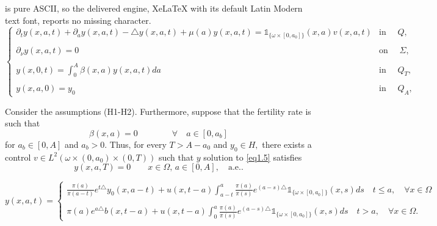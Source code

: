\documentclass[10pt,a4paper]{amsart}
\begin{document}
is pure ASCII, so the delivered engine, XeLaTeX with its default Latin Modern text font, reports no missing character.
\begin{equation}\label{eq1.5}
\left\lbrace 
\begin{array}{ll}
\partial_{t}y(x,a,t)+\partial_{a}y(x,a,t)-\triangle y(x,a,t)+\mu(a) y(x,a,t)=\mathds{1}_{\lbrace\omega\times[0,a_0]\rbrace}(x,a)v(x,a,t) &\text{in }\quad Q,\\
 \\\partial_{\nu}y(x,a,t)=0 &\text{on }\quad \Sigma,\\
 \\y(x,0,t)=\displaystyle\int_{0}^{A}\beta(x,a)y(x,a,t)da &\text{in }\quad Q_{T},\\
 \\y(x,a,0)=y_{0} &\text{in }\quad Q_{A},
\end{array}
\right.
\end{equation} 

\begin{proposition}\label{th1.3}
Consider the assumptions (H1-H2). Furthermore, suppose that the fertility rate is such that
\begin{equation*}
\beta(x,a)=0\qquad\qquad \forall\quad a\in [0, a_b]
\end{equation*}
for $a_b \in [0, A]$ and $a_b>0$. Thus, for every $T>A-a_0$ and  $y_0\in H,$ there exists a control $v\in L^2(\omega\times(0,a_0)\times(0,T) )$ such that $y$ solution to \eqref{eq1.5} satisfies
\begin{equation}\label{e3.2}
y(x,a,T)=0\qquad x\in\Omega,\,a\in [0,A],\quad\text{a.e.}.
\end{equation}
\end{proposition}

\begin{equation}\label{eq2.6}
y(x,a,t)=\left\lbrace
\begin{array}{ll}
\frac{\pi(a)}{\pi(a-t)}e^{t\triangle}y_{0}(x,a-t)+u(x,t-a)\displaystyle\int_{a-t}^{a}\frac{\pi(a)}{\pi(s)}e^{(a-s)\triangle}\mathds{1}_{\lbrace\omega\times[0,a_0]\rbrace}(x,s)ds\quad t\leq a,\quad \forall x\in \Omega\\
\\\pi(a)e^{a\triangle}b(x,t-a)+u(x,t-a)\displaystyle\int_{0}^{a}\frac{\pi(a)}{\pi(s)}e^{(a-s)\triangle}\mathds{1}_{\lbrace\omega\times[0,a_0]\rbrace}(x,s)ds\quad t> a, \quad \forall x\in \Omega.
\end{array}
\right.
\end{equation}
\end{document}
